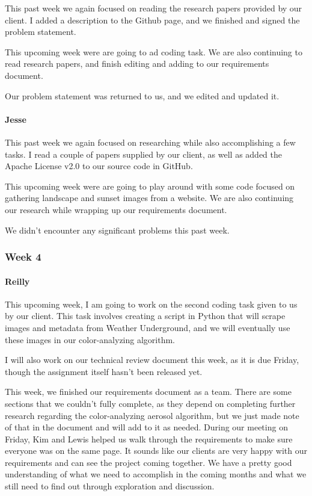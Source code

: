 \documentclass[onecolumn, draftclsnofoot,10pt, compsoc]{IEEEtran}
\begin{document}
\begin{flushleft}
This past week we again focused on reading the research papers provided by our client. I added a description to the Github page, and we finished and signed the problem statement.
 
 
This upcoming week were are going to ad coding task. We are also continuing to read research papers, and finish editing and adding to our requirements document.
 
 
Our problem statement was returned to us, and we edited and updated it.
 
\paragraph{Jesse}
 
This past week we again focused on researching while also accomplishing a few tasks. I read a couple of papers supplied by our client, as well as added the Apache License v2.0 to our source code in GitHub.
 
 
This upcoming week were are going to play around with some code focused on gathering landscape and sunset images from a website. We are also continuing our research while wrapping up our requirements document.
 
 
We didn't encounter any significant problems this past week.
 
\subsubsection{Week 4}
\paragraph{Reilly}
 
This upcoming week, I am going to work on the second coding task given to us by our client. This task involves creating a script in Python that will scrape images and metadata from Weather Underground, and we will eventually use these images in our color-analyzing algorithm.
 
I will also work on our technical review document this week, as it is due Friday, though the assignment itself hasn't been released yet.
 
 
This week, we finished our requirements document as a team. There are some sections that we couldn't fully complete, as they depend on completing further research regarding the color-analyzing aerosol algorithm, but we just made note of that in the document and will add to it as needed. During our meeting on Friday, Kim and Lewis helped us walk through the requirements to make sure everyone was on the same page. It sounds like our clients are very happy with our requirements and can see the project coming together. We have a pretty good understanding of what we need to accomplish in the coming months and what we still need to find out through exploration and discussion.
 

\end{flushleft}
\end{document}
